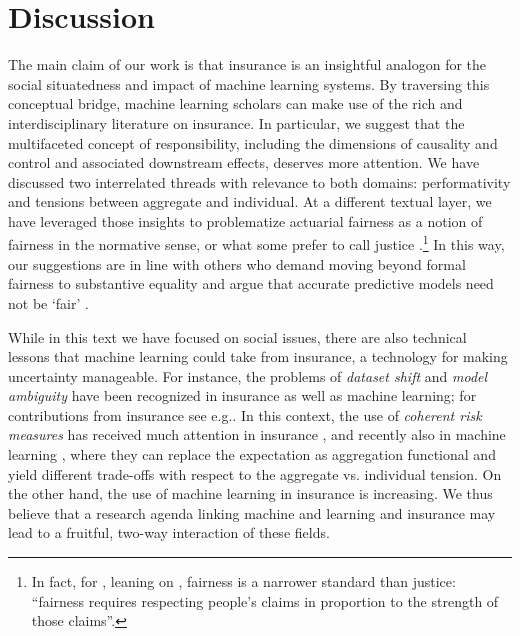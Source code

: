 \documentclass[11pt]{article} %
\makeatletter
\newcommand*{\eg}{e.g.\@\xspace}
\newcommand*{\versus}{vs.\@\xspace}
\makeatother
\begin{document}
\section{Discussion}
The main claim of our work is that insurance is an insightful analogon for the social situatedness and impact of machine learning systems. By traversing this conceptual bridge, machine learning scholars can make use of the rich and interdisciplinary literature on insurance. In particular, we suggest that the multifaceted concept of responsibility, including the dimensions of causality and control and associated downstream effects, deserves more attention. We have discussed two interrelated threads with relevance to both domains: performativity and tensions between aggregate and individual. 
At a different textual layer, we have leveraged those insights to problematize actuarial fairness as a notion of fairness in the normative sense, or what some prefer to call justice \citep{vredenburghfairness}.\footnote{In fact, for \citet{vredenburghfairness}, leaning on \citet{broome1990fairness}, fairness is a narrower standard than justice: ``fairness requires respecting
people's claims in proportion to the strength of those claims''.} In this way, our suggestions are in line with others who demand moving beyond formal fairness to substantive equality \citep{green2022escaping} and argue that accurate predictive models need not be `fair' \citep{eidelson2021patterned}.

While in this text we have focused on social issues, there are also technical lessons that machine learning could take from insurance, a technology for making uncertainty manageable. For instance, the problems of \textit{dataset shift} and \textit{model ambiguity} have been recognized in insurance as well as machine learning; for contributions from insurance see \eg \citep{milevsky2006killing,cabantous2007ambiguity,pichler2014insurance,dietz2021pricing}. In this context, the use of \textit{coherent risk measures} has received much attention in insurance \citep{artzner1999application}, and recently also in machine learning \citep{frohlich2022risk,royset2022risk}, where they can replace the expectation as aggregation functional and yield different trade-offs with respect to the aggregate \versus individual tension. On the other hand, the use of machine learning in insurance is increasing. We thus believe that a research agenda linking machine and learning and insurance may lead to a fruitful, two-way interaction of these fields.
\end{document}
